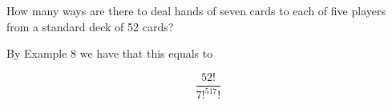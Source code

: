 \documentclass[../main.tex]{subfiles}
\begin{document}
How many ways are there to deal hands of seven cards to each of five players from a standard deck of 52 cards?

\solution

By Example 8 we have that this equals to

\[ \frac{52!}{7!^517!} \]
\end{document}
